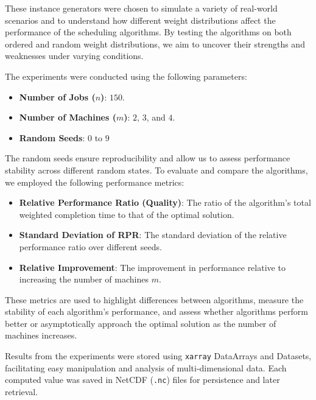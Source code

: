 These instance generators were chosen to simulate a variety of real-world scenarios and to understand how different weight distributions affect the performance of the scheduling algorithms. By testing the algorithms on both ordered and random weight distributions, we aim to uncover their strengths and weaknesses under varying conditions.

The experiments were conducted using the following parameters:

\begin{itemize}
    \item \textbf{Number of Jobs ($n$)}: $150$.
    \item \textbf{Number of Machines ($m$)}: $2$, $3$, and $4$.
    \item \textbf{Random Seeds}: $0$ to $9$
\end{itemize}

The random seeds ensure reproducibility and allow us to assess performance stability across different random states. To evaluate and compare the algorithms, we employed the following performance metrics:

\begin{itemize}
    \item \textbf{Relative Performance Ratio (Quality)}: The ratio of the algorithm's total weighted completion time to that of the optimal solution.
    \item \textbf{Standard Deviation of RPR}: The standard deviation of the relative performance ratio over different seeds.
    \item \textbf{Relative Improvement}: The improvement in performance relative to increasing the number of machines $m$.
\end{itemize}

These metrics are used to highlight differences between algorithms, measure the stability of each algorithm's performance, and assess whether algorithms perform better or asymptotically approach the optimal solution as the number of machines increases.

Results from the experiments were stored using \texttt{xarray} DataArrays and Datasets, facilitating easy manipulation and analysis of multi-dimensional data. Each computed value was saved in NetCDF (\texttt{.nc}) files for persistence and later retrieval.
